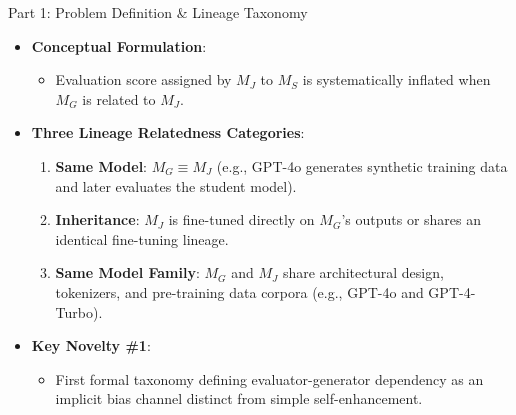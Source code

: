 \documentclass[10pt]{beamer}
\begin{document}
	\begin{frame}{Part 1: Problem Definition \& Lineage Taxonomy}
		\begin{itemize}
			\item \textbf{Conceptual Formulation}:
			\begin{itemize}
				\item Evaluation score assigned by $M_J$ to $M_S$ is systematically inflated when $M_G$ is related to $M_J$.
			\end{itemize}
			\vspace{0.2cm}
			\item \textbf{Three Lineage Relatedness Categories}:
			\begin{enumerate}
				\item \textbf{Same Model}: $M_G \equiv M_J$ (e.g., GPT-4o generates synthetic training data and later evaluates the student model).
				\item \textbf{Inheritance}: $M_J$ is fine-tuned directly on $M_G$'s outputs or shares an identical fine-tuning lineage.
				\item \textbf{Same Model Family}: $M_G$ and $M_J$ share architectural design, tokenizers, and pre-training data corpora (e.g., GPT-4o and GPT-4-Turbo).
			\end{enumerate}
			\vspace{0.2cm}
			\item \textbf{Key Novelty \#1}:
			\begin{itemize}
				\item First formal taxonomy defining evaluator-generator dependency as an implicit bias channel distinct from simple self-enhancement.
			\end{itemize}
		\end{itemize}
	\end{frame}
	
\end{document}
